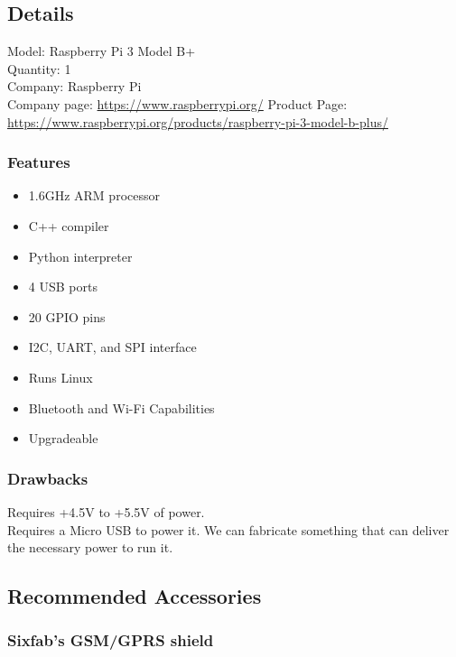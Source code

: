 \subsection{Details}

Model: Raspberry Pi 3 Model B+\\
Quantity: 1 \\
Company: Raspberry Pi \\
Company page: \href{https://www.raspberrypi.org/}{https://www.raspberrypi.org/}
Product Page:  \href{https://www.raspberrypi.org/products/raspberry-pi-3-model-b-plus/}{https://www.raspberrypi.org/products/raspberry-pi-3-model-b-plus/}

\subsubsection{Features}
\begin{itemize}
	\item 1.6GHz ARM processor
	\item C++ compiler
	\item Python interpreter
	\item 4 USB ports
	\item 20 GPIO pins
	\item I2C, UART, and SPI interface
	\item Runs Linux
	\item Bluetooth and Wi-Fi Capabilities
	\item Upgradeable
\end{itemize}

\subsubsection{Drawbacks}

Requires +4.5V to +5.5V of power.\\
Requires a Micro USB to power it. We can fabricate something that can deliver the necessary power to run it.

\subsection{Recommended Accessories}

\subsubsection{Sixfab’s GSM/GPRS shield}

